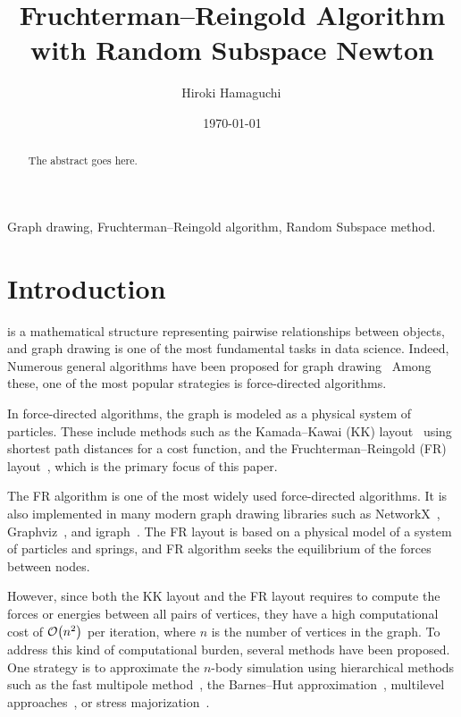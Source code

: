 \documentclass[dvipdfmx,journal]{IEEEtran}
\begin{document}
\title{Fruchterman--Reingold Algorithm with Random Subspace Newton}
\author{Hiroki Hamaguchi\,}
\date{\today}
\maketitle

\begin{abstract}
  The abstract goes here.
  \lipsum[1]
\end{abstract}

\begin{IEEEkeywords}
  Graph drawing, Fruchterman--Reingold algorithm, Random Subspace method.
\end{IEEEkeywords}

\section{Introduction}

 is a mathematical structure representing pairwise relationships between objects, and graph drawing is one of the most fundamental tasks in data science. Indeed, Numerous general algorithms have been proposed for graph drawing~\cite{tutteHowDrawGraph1963,chrobakLineartimeAlgorithmDrawing1995,sugiyamaMethodsVisualUnderstanding1981,ghassemitoosiSimulatedAnnealingPreProcessing2016}
Among these, one of the most popular strategies is force-directed algorithms.

In force-directed algorithms, the graph is modeled as a physical system of particles. These include methods such as the Kamada--Kawai (KK) layout~\cite{kamadaAlgorithmDrawingGeneral1989} using shortest path distances for a cost function, and the Fruchterman--Reingold (FR) layout~\cite{fruchtermanGraphDrawingForcedirected1991}, which is the primary focus of this paper.

The FR algorithm is one of the most widely used force-directed algorithms. It is also implemented in many modern graph drawing libraries such as NetworkX~\cite{osti_960616}, Graphviz~\cite{ellsonGraphvizOpenSource2002}, and igraph~\cite{csardiIgraphSoftwarePackage2006}. The FR layout is based on a physical model of a system of particles and springs, and FR algorithm seeks the equilibrium of the forces between nodes.

However, since both the KK layout and the FR layout requires to compute the forces or energies between all pairs of vertices, they have a high computational cost of $\order{n^2}$ per iteration, where $n$ is the number of vertices in the graph. To address this kind of computational burden, several methods have been proposed. One strategy is to approximate the $n$-body simulation using hierarchical methods such as the fast multipole method~\cite{greengardFastAlgorithmParticle1987}, the Barnes--Hut approximation~\cite{barnesHierarchicalLogForcecalculation1986}, multilevel approaches~\cite{Hu2006EfficientHF}, or stress majorization~\cite{gansnerGraphDrawingStress2005}.
\end{document}

